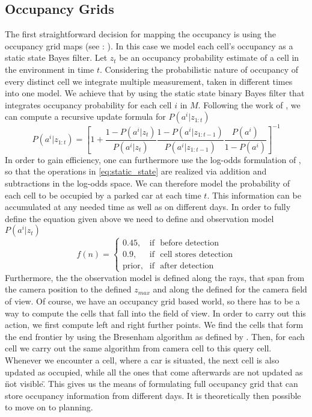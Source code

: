     \subsection{Occupancy Grids} %
    \label{sub:occupancy_grids}
        The first straightforward decision for mapping the occupancy is using the occupancy grid maps (see : ). In this case we model each cell's occupancy as a static state Bayes filter.
        Let $z_t$ be an occupancy probability estimate of a cell in the environment in time $t$. Considering the probabilistic nature of occupancy of every distinct cell we integrate multiple measurement, taken in different times into one model. We achieve that by using the static state binary Bayes filter that integrates occupancy probability for each cell $i$ in $M$. Following the work of \cite{moravec1988}, we can compute a recursive update formula for $P(a^i | z_{1:t})$
        \begin{equation}
        \label{eq:static_state}
            P(a^i | z_{1:t}) = \left[1 + \frac{1 - P(a^i | z_{t})}{P(a^i | z_{t})} \frac{1 - P(a^i | z_{1:t-1})}{P(a^i | z_{1:t-1})} \frac{P(a^i)}{1 - P(a^i)} \right]^{-1}
        \end{equation}
        In order to gain efficiency, one can furthermore use the log-odds formulation of \cite{moravec1988}, so that the operations in \eqref{eq:static_state} are realized via addition and subtractions in the log-odds space.
        We can therefore model the probability of each cell to be occupied by a parked car at each time $t$.
        This information can be accumulated at any needed time as well as on different days.
        In order to fully define the equation given above we need to define and observation model $P(a^i | z_t)$
        \begin{equation}
        \label{eq:observation_model}
            f(n) = \begin{cases} 0.45, & \mbox{if } \mbox{ before detection} \\ 0.9, & \mbox{if } \mbox{ cell stores detection} \\ \mbox{prior}, & \mbox{if } \mbox{ after detection} \end{cases}
        \end{equation}
        Furthermore, the the observation model is defined along the rays, that span from the camera position to the defined $z_{max}$ and along the defined for the camera field of view. Of course, we have an occupancy grid based world, so there has to be a way to compute the cells that fall into the field of view. In order to carry out this action, we first compute left and right further points. We find the cells that form the end frontier by using the Bresenham algorithm as defined by \cite{bresenham1965}. Then, for each cell we carry out the same algorithm from camera cell to this query cell. Whenever we encounter a cell, where a car is situated, the next cell is also updated as occupied, while all the ones that come afterwards are not updated as \"not visible\".
        This gives us the means of formulating full occupancy grid that can store occupancy information from different days. It is theoretically then possible to move on to planning.
